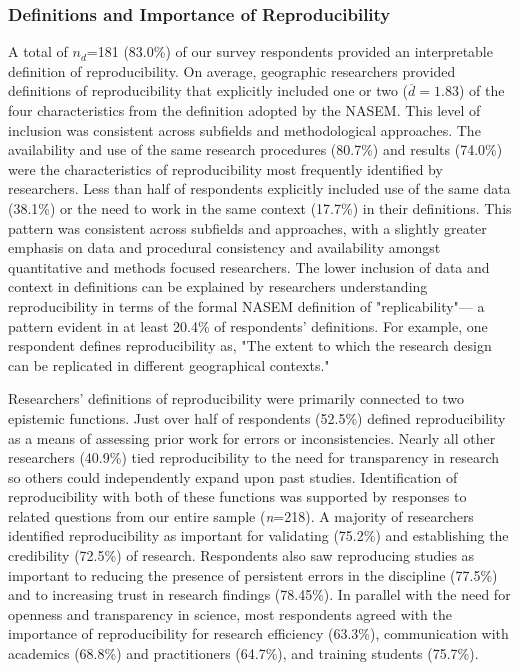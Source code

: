 \documentclass[]{interact}
\theoremstyle{plain}%
\theoremstyle{definition}
\theoremstyle{remark}
\begin{document}
\subsubsection*{Definitions and Importance of Reproducibility}
A total of \textit{$n_{d}$}=181 (83.0\%) of our survey respondents provided an interpretable definition of reproducibility.  
On average, geographic researchers provided definitions of reproducibility that explicitly included one or two ($\overline{d}=1.83$) of the four characteristics from the definition adopted by the NASEM.
This level of inclusion was consistent across subfields and methodological approaches.
The availability and use of the same research procedures (80.7\%) and results (74.0\%) were the characteristics of reproducibility most frequently identified by researchers. 
Less than half of respondents explicitly included use of the same data (38.1\%) or the need to work in the same context (17.7\%) in their definitions. 
This pattern was consistent across subfields and approaches, with a slightly greater emphasis on data and procedural consistency and availability amongst quantitative and methods focused researchers.
The lower inclusion of data and context in definitions can be explained by researchers understanding reproducibility in terms of the formal NASEM definition of "replicability"--- a pattern evident in at least 20.4\% of respondents' definitions. For example, one respondent defines reproducibility as, "The extent to which the research design can be replicated in different geographical contexts."

Researchers' definitions of reproducibility were primarily connected to two epistemic functions.
Just over half of respondents (52.5\%) defined reproducibility as a means of assessing prior work for errors or inconsistencies.
Nearly all other researchers (40.9\%) tied reproducibility to the need for transparency in research so others could independently expand upon past studies.
Identification of reproducibility with both of these functions was supported by responses to related questions from our entire sample (\textit{n}=218). 
A majority of researchers identified reproducibility as important for validating (75.2\%) and establishing the credibility (72.5\%) of research.  
Respondents also saw reproducing studies as important to reducing the presence of persistent errors in the discipline (77.5\%) and to increasing trust in research findings (78.45\%).
In parallel with the need for openness and transparency in science, most respondents agreed with the importance of reproducibility for research efficiency (63.3\%), communication with academics (68.8\%) and practitioners (64.7\%), and training students (75.7\%).
\end{document}
